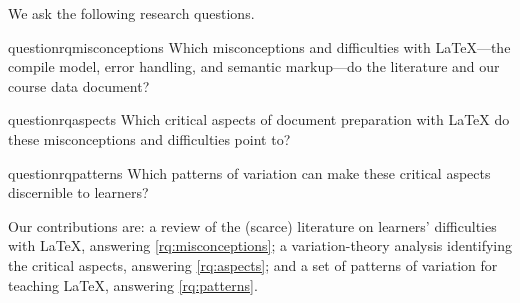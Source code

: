 We ask the following research questions.

\begin{frame}
\begin{restatable}{question}{rqmisconceptions}\label{rq:misconceptions}
  Which misconceptions and difficulties with LaTeX---the compile model,
  error handling, and semantic markup---do the literature and our course
  data document?
\end{restatable}

\begin{restatable}{question}{rqaspects}\label{rq:aspects}
  Which critical aspects of document preparation with LaTeX do these
  misconceptions and difficulties point to?
\end{restatable}

\begin{restatable}{question}{rqpatterns}\label{rq:patterns}
  Which patterns of variation can make these critical aspects discernible
  to learners?
\end{restatable}
\end{frame}

Our contributions are:
a review of the (scarce) literature on learners' difficulties with LaTeX,
answering \cref{rq:misconceptions};
a variation-theory analysis identifying the critical aspects, answering
\cref{rq:aspects};
and a set of patterns of variation for teaching LaTeX, answering
\cref{rq:patterns}.
